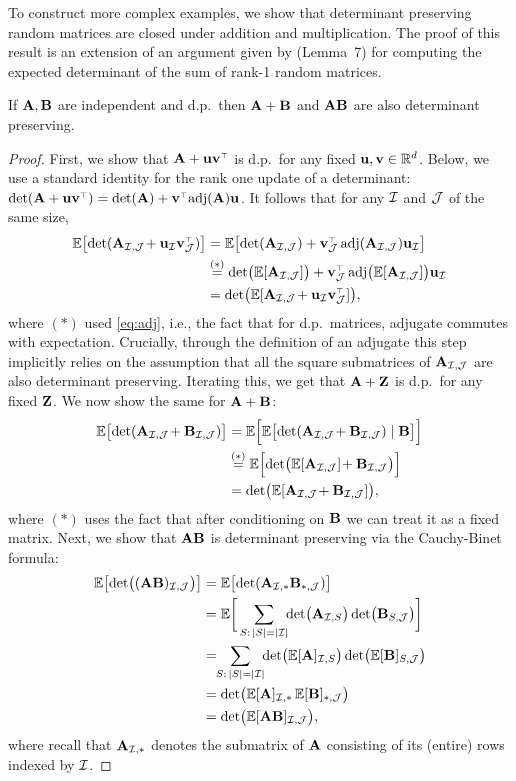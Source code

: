 \documentclass[11pt]{article}
\begin{document}
To construct more complex examples, we show that determinant preserving random matrices are
closed under addition and multiplication. The proof of this result is an extension of an
argument given by \cite{determinantal-averaging} (Lemma~7) for
computing the expected determinant of the sum of rank-1 random matrices.
\begin{lemma}\label{t:ring}
  If $\mathbf A,\mathbf B$ are independent and d.p.~then
  $\mathbf A+\mathbf B$ and $\mathbf A\mathbf B$ are also determinant preserving.
\end{lemma}
\begin{proof}
 First, we show that $\A+\u\v^\top$ is d.p.~for any fixed
 $\mathbf u,\mathbf v\in\mathbb R^d$. Below, we use a standard identity for the rank one
 update of a determinant:
 $\det(\A+\u\v^\top)=\det(\A)+\v^\top\!\adj(\A)\u$. It follows that
 for any $\mathcal I$ and $\mathcal{J}$ of the same size,
  \begin{align*}
\E\big[\!\det(\A_{\Ic,\Jc}\!+\u_{\Ic}\v_{\Jc}^\top)\big] &=
    \E\big[\!\det(\A_{\Ic,\Jc}) +
    \v_{\Jc}^\top\adj(\A_{\Ic,\Jc}) \u_{\Ic}\big]\\
    &\overset{(*)}{=}\det\!\big(\E[\A_{\Ic,\Jc}]\big) +
      \v_{\Jc}^\top\adj\!\big(\E[\A_{\Ic,\Jc}]\big) \u_{\Ic}\\
    &=\det\!\big(\E[\A_{\Ic,\Jc} \!+ \u_{\Ic}\v_{\Jc}^\top]\big),
  \end{align*}
  where $(*)$ used \eqref{eq:adj}, i.e., the fact that for d.p.~matrices, adjugate commutes
  with expectation. Crucially, through the definition of an adjugate
  this step implicitly relies on the assumption that all the square
  submatrices of $\mathbf A_{\mathcal I,\mathcal{J}}$ are also  determinant preserving.
  Iterating this, we get that $\mathbf A+\mathbf Z$ is d.p.~for any fixed
  $\mathbf Z$. We now show the same for $\mathbf A+\mathbf B$:
  \begin{align*}
\E\big[\!\det(\A_{\Ic,\Jc}\!+\B_{\Ic,\Jc})\big]
    &=
      \E\Big[\E\big[\!\det(\A_{\Ic,\Jc}\!+\B_{\Ic,\Jc})\mid\B\big]\Big]\\
    &\overset{(*)}{=}\E\Big[\!\det\!\big(\E[\A_{\Ic,\Jc}]\!+\B_{\Ic,\Jc}\big)\Big]\\
      &= \det\!\big(\E[\A_{\Ic,\Jc}\!+\B_{\Ic,\Jc}]\big),
  \end{align*}
  where $(*)$  uses the fact that after conditioning on $\mathbf B$ we can
  treat it as a fixed matrix. Next, we show that $\mathbf A\mathbf B$ is determinant preserving via the Cauchy-Binet formula:
  \begin{align*}
    \E\big[\!\det\!\big((\A\B)_{\Ic,\Jc}\big)\big]
    &= \E\big[\!\det(\A_{\Ic,*}\B_{*,\Jc})\big]\\
    &=\E\bigg[\sum_{S:\,|S|=|\Ic|}\!\!\det\!\big(\A_{\Ic,S}\big)
      \det\!\big(\B_{S,\Jc}\big)\bigg]\\
&=\!\!\sum_{S:\,|S|=|\Ic|}\!\!\det\!\big(\E[\A]_{\Ic,S}\big)
                                                \det\!\big(\E[\B]_{S,\Jc}\big)\\
    &=\det\!\big(\E[\A]_{\Ic,*}\, \E[\B]_{*,\Jc}\big)\\
      &= \det\!\big(\E[\A\B]_{\Ic,\Jc}\big),
  \end{align*}
  where recall that $\mathbf A_{\mathcal I,*}$ denotes the submatrix of $\mathbf A$
  consisting of its (entire) rows indexed by $\mathcal I$.
  \end{proof}
\end{document}
